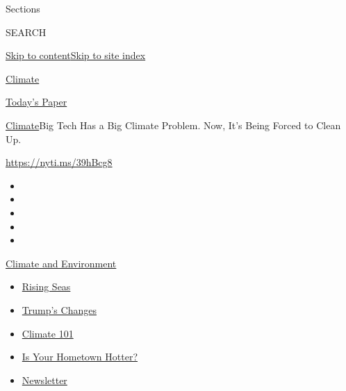 Sections

SEARCH

\protect\hyperlink{site-content}{Skip to
content}\protect\hyperlink{site-index}{Skip to site index}

\href{https://www.nytimes3xbfgragh.onion/section/climate}{Climate}

\href{https://myaccount.nytimes3xbfgragh.onion/auth/login?response_type=cookie\&client_id=vi}{}

\href{https://www.nytimes3xbfgragh.onion/section/todayspaper}{Today's
Paper}

\href{/section/climate}{Climate}\textbar{}Big Tech Has a Big Climate
Problem. Now, It's Being Forced to Clean Up.

\url{https://nyti.ms/39hBcg8}

\begin{itemize}
\item
\item
\item
\item
\item
\end{itemize}

\href{https://www.nytimes3xbfgragh.onion/section/climate?action=click\&pgtype=Article\&state=default\&region=TOP_BANNER\&context=storylines_menu}{Climate
and Environment}

\begin{itemize}
\tightlist
\item
  \href{https://www.nytimes3xbfgragh.onion/2020/07/30/climate/sea-level-inland-floods.html?action=click\&pgtype=Article\&state=default\&region=TOP_BANNER\&context=storylines_menu}{Rising
  Seas}
\item
  \href{https://www.nytimes3xbfgragh.onion/interactive/2020/climate/trump-environment-rollbacks.html?action=click\&pgtype=Article\&state=default\&region=TOP_BANNER\&context=storylines_menu}{Trump's
  Changes}
\item
  \href{https://www.nytimes3xbfgragh.onion/interactive/2020/04/19/climate/climate-crash-course-1.html?action=click\&pgtype=Article\&state=default\&region=TOP_BANNER\&context=storylines_menu}{Climate
  101}
\item
  \href{https://www.nytimes3xbfgragh.onion/interactive/2018/08/30/climate/how-much-hotter-is-your-hometown.html?action=click\&pgtype=Article\&state=default\&region=TOP_BANNER\&context=storylines_menu}{Is
  Your Hometown Hotter?}
\item
  \href{https://www.nytimes3xbfgragh.onion/newsletters/climate-change?action=click\&pgtype=Article\&state=default\&region=TOP_BANNER\&context=storylines_menu}{Newsletter}
\end{itemize}

